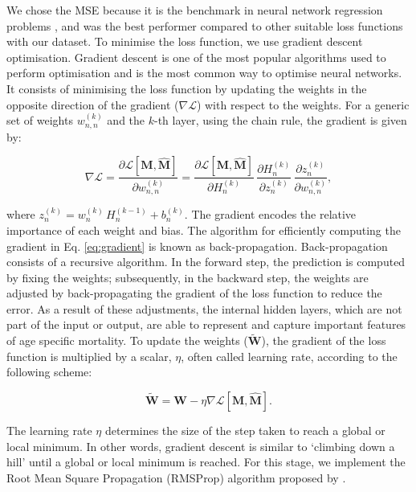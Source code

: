 \documentclass[a4,11pt]{article}
\begin{document}
We chose the MSE because it is the benchmark in neural network regression problems \citep{lecun2015}, and was the best performer compared to other suitable loss functions with our dataset. To minimise the loss function, we use gradient descent optimisation. Gradient descent is one of the most popular algorithms used to perform optimisation and is the most common way to optimise neural networks. It consists of minimising the loss function by updating the weights in the opposite direction of the gradient ($\nabla \mathcal{L}$) with respect to the weights. For a generic set of weights $w_{n,n}^{(k)}$ and the $k$-th layer, using the chain rule, the gradient is given by:

%
\begin{equation}
\label{eq:gradient}
\nabla \mathcal{L} = \frac{\partial \mathcal{L}[\mathbf{M},\mathbf{\hat{M}}]}{\partial w_{n,n}^{(k)}} =\frac{\partial \mathcal{L}[\mathbf{M},\mathbf{\hat{M}}]}{\partial H_n^{(k)}}\,\frac{{\partial H_n^{(k)}}}{\partial z_n^{(k)}} \, \frac{\partial z_n^{(k)}}{\partial w_{n,n}^{(k)}},
\end{equation}
%

where $ z_n^{(k)}=w_{n}^{(k)}\,H_{n}^{(k-1)}+b_n^{(k)}$. The gradient encodes the relative importance of each weight and bias. The algorithm for efficiently computing the gradient in Eq. \eqref{eq:gradient} is known as back-propagation. Back-propagation consists of a recursive algorithm. In the forward step, the prediction is computed by fixing the weights; subsequently, in the backward step, the weights are adjusted by back-propagating the gradient of the loss function to reduce the error. As a result of these adjustments, the internal hidden layers, which are not part of the input or output, are able to represent and capture important features of age specific mortality. To update the weights ($\tilde{\mathbf{W}}$), the gradient of the loss function is multiplied by a scalar, $\eta$, often called learning rate, according to the following scheme:

%
\begin{equation}
\tilde{\mathbf{W}} = \mathbf{W}-\eta \nabla \mathcal{L} \left[\mathbf{M},\mathbf{\hat{M}}\right].
\end{equation}
%

The learning rate $\eta$ determines the size of the step taken to reach a global or local minimum. In other words, gradient descent is similar to `climbing down a hill' until a global or local minimum is reached. For this stage, we implement the Root Mean Square Propagation (RMSProp) algorithm proposed by \cite{hinton2012neural}.
\end{document}
